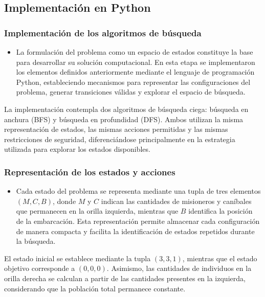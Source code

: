 \documentclass[
  spanish,
]{llncs}
\providecommand{\tightlist}{%
  \setlength{\itemsep}{0pt}\setlength{\parskip}{0pt}}
\begin{document}
\subsection{Implementación en Python}\label{implementaciuxf3n-en-python}

\subsubsection{Implementación de los algoritmos de
búsqueda}\label{implementaciuxf3n-de-los-algoritmos-de-buxfasqueda}

\begin{itemize}
\tightlist
\item
  La formulación del problema como un espacio de estados constituye la
  base para desarrollar su solución computacional. En esta etapa se
  implementaron los elementos definidos anteriormente mediante el
  lenguaje de programación Python, estableciendo mecanismos para
  representar las configuraciones del problema, generar transiciones
  válidas y explorar el espacio de búsqueda.
\end{itemize}

La implementación contempla dos algoritmos de búsqueda ciega: búsqueda
en anchura (BFS) y búsqueda en profundidad (DFS). Ambos utilizan la
misma representación de estados, las mismas acciones permitidas y las
mismas restricciones de seguridad, diferenciándose principalmente en la
estrategia utilizada para explorar los estados disponibles.

\subsubsection{Representación de los estados y
acciones}\label{representaciuxf3n-de-los-estados-y-acciones}

\begin{itemize}
\tightlist
\item
  Cada estado del problema se representa mediante una tupla de tres
  elementos \((M,C,B)\), donde \(M\) y \(C\) indican las cantidades de
  misioneros y caníbales que permanecen en la orilla izquierda, mientras
  que \(B\) identifica la posición de la embarcación. Esta
  representación permite almacenar cada configuración de manera compacta
  y facilita la identificación de estados repetidos durante la búsqueda.
\end{itemize}

El estado inicial se establece mediante la tupla \((3,3,1)\), mientras
que el estado objetivo corresponde a \((0,0,0)\). Asimismo, las
cantidades de individuos en la orilla derecha se calculan a partir de
las cantidades presentes en la izquierda, considerando que la población
total permanece constante.
\end{document}
